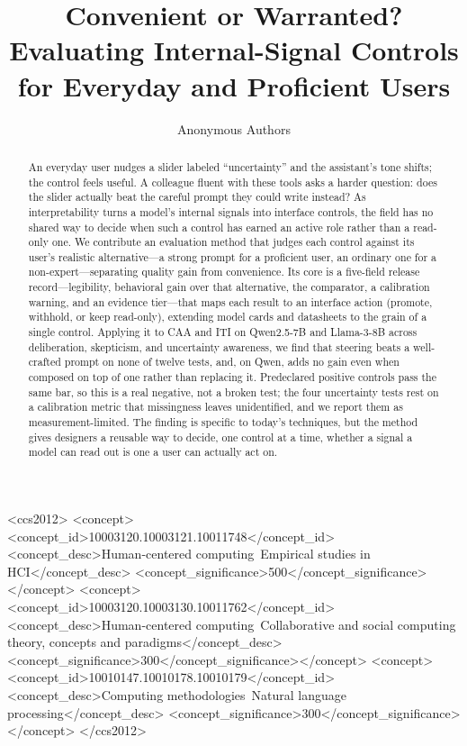 \documentclass[manuscript,review,anonymous]{acmart}
\begin{document}
\title{Convenient or Warranted? Evaluating Internal-Signal Controls for Everyday and Proficient Users}
\renewcommand{\shorttitle}{Convenient or Warranted?}

\author{Anonymous Authors}

\begin{abstract}
An everyday user nudges a slider labeled ``uncertainty'' and the assistant's tone shifts; the control feels useful. A colleague fluent with these tools asks a harder question: does the slider actually beat the careful prompt they could write instead? As interpretability turns a model's internal signals into interface controls, the field has no shared way to decide when such a control has earned an active role rather than a read-only one. We contribute an evaluation method that judges each control against its user's realistic alternative---a strong prompt for a proficient user, an ordinary one for a non-expert---separating quality gain from convenience. Its core is a five-field release record---legibility, behavioral gain over that alternative, the comparator, a calibration warning, and an evidence tier---that maps each result to an interface action (promote, withhold, or keep read-only), extending model cards and datasheets to the grain of a single control. Applying it to CAA and ITI on Qwen2.5-7B and Llama-3-8B across deliberation, skepticism, and uncertainty awareness, we find that steering beats a well-crafted prompt on none of twelve tests, and, on Qwen, adds no gain even when composed on top of one rather than replacing it. Predeclared positive controls pass the same bar, so this is a real negative, not a broken test; the four uncertainty tests rest on a calibration metric that missingness leaves unidentified, and we report them as measurement-limited. The finding is specific to today's techniques, but the method gives designers a reusable way to decide, one control at a time, whether a signal a model can read out is one a user can actually act on.
\end{abstract}

\begin{CCSXML}
<ccs2012>
 <concept><concept_id>10003120.10003121.10011748</concept_id>
  <concept_desc>Human-centered computing~Empirical studies in HCI</concept_desc>
  <concept_significance>500</concept_significance></concept>
 <concept><concept_id>10003120.10003130.10011762</concept_id>
  <concept_desc>Human-centered computing~Collaborative and social computing theory, concepts and paradigms</concept_desc>
  <concept_significance>300</concept_significance></concept>
 <concept><concept_id>10010147.10010178.10010179</concept_id>
  <concept_desc>Computing methodologies~Natural language processing</concept_desc>
  <concept_significance>300</concept_significance></concept>
</ccs2012>
\end{CCSXML}
\end{document}
